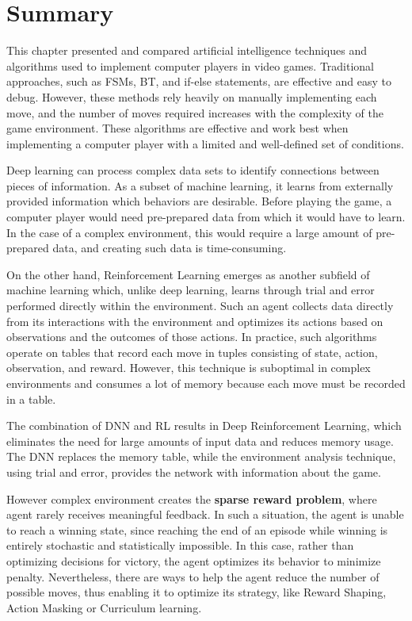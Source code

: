 \section{Summary}
This chapter presented and compared artificial intelligence techniques and algorithms used to implement computer players in video games. Traditional approaches, such as FSMs, BT, and if-else statements, are effective and easy to debug. However, these methods rely heavily on manually implementing each move, and the number of moves required increases with the complexity of the game environment. These algorithms are effective and work best when implementing a computer player with a limited and well-defined set of conditions.

Deep learning can process complex data sets to identify connections between pieces of information. As a subset of machine learning, it learns from externally provided information which behaviors are desirable. Before playing the game, a computer player would need pre-prepared data from which it would have to learn. In the case of a complex environment, this would require a large amount of pre-prepared data, and creating such data is time-consuming. 

On the other hand, Reinforcement Learning emerges as another subfield of machine learning which, unlike deep learning, learns through trial and error performed directly within the environment. Such an agent collects data directly from its interactions with the environment and optimizes its actions based on observations and the outcomes of those actions. In practice, such algorithms operate on tables that record each move in tuples consisting of state, action, observation, and reward. However, this technique is suboptimal in complex environments and consumes a lot of memory because each move must be recorded in a table.

The combination of DNN and RL results in Deep Reinforcement Learning, which eliminates the need for large amounts of input data and reduces memory usage. The DNN replaces the memory table, while the environment analysis technique, using trial and error, provides the network with information about the game.

However complex environment creates the \textbf{sparse reward problem}, where agent rarely receives meaningful feedback. In such a situation, the agent is unable to reach a winning state, since reaching the end of an episode while winning is entirely stochastic and statistically impossible. In this case, rather than optimizing decisions for victory, the agent optimizes its behavior to minimize penalty. Nevertheless, there are ways to help the agent reduce the number of possible moves, thus enabling it to optimize its strategy, like Reward Shaping, Action Masking or Curriculum learning.

